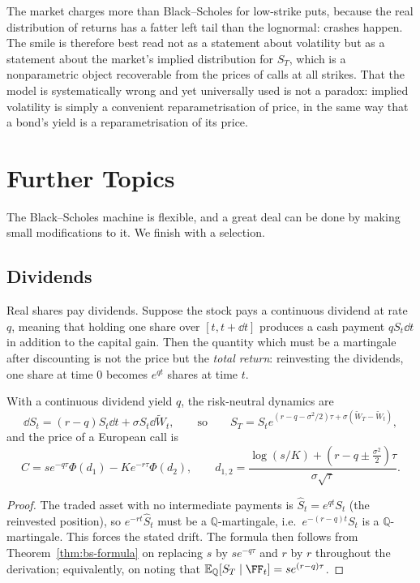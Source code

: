 \documentclass[a4paper]{scrartcl}
\newcommand{\QQ}{\mathbb{Q}}
\begin{document}
The market charges more than Black--Scholes for low-strike puts, because the real distribution of returns has a fatter left tail than the lognormal: crashes happen. The smile is therefore best read not as a statement about volatility but as a statement about the market's implied distribution for $S_T$, which is a nonparametric object recoverable from the prices of calls at all strikes. That the model is systematically wrong and yet universally used is not a paradox: implied volatility is simply a convenient reparametrisation of price, in the same way that a bond's yield is a reparametrisation of its price.

\section{Further Topics}

The Black--Scholes machine is flexible, and a great deal can be done by making small modifications to it. We finish with a selection.

\subsection{Dividends}

Real shares pay dividends. Suppose the stock pays a continuous dividend at rate $q$, meaning that holding one share over $[t,t+\dd t]$ produces a cash payment $qS_t\dd t$ in addition to the capital gain. Then the quantity which must be a martingale after discounting is not the price but the \emph{total return}: reinvesting the dividends, one share at time $0$ becomes $e^{qt}$ shares at time $t$.

\begin{proposition}
	With a continuous dividend yield $q$, the risk-neutral dynamics are
	$$
	\dd S_t = (r-q)S_t\dd t + \sigma S_t\dd\tilde W_t,\qquad\text{so}\qquad S_T = S_te^{(r-q-\sigma^2/2)\tau + \sigma(\tilde W_T-\tilde W_t)},
	$$
	and the price of a European call is
	$$
	C = se^{-q\tau}\Phi(d_1) - Ke^{-r\tau}\Phi(d_2), \qquad d_{1,2} = \frac{\log(s/K) + (r - q\pm\tfrac{\sigma^2}{2})\tau}{\sigma\sqrt\tau}.
	$$
\end{proposition}

\begin{proof}
	The traded asset with no intermediate payments is $\hat S_t = e^{qt}S_t$ (the reinvested position), so $e^{-rt}\hat S_t$ must be a $\QQ$-martingale, i.e.\ $e^{-(r-q)t}S_t$ is a $\QQ$-martingale. This forces the stated drift. The formula then follows from Theorem~\ref{thm:bs-formula} on replacing $s$ by $se^{-q\tau}$ and $r$ by $r$ throughout the derivation; equivalently, on noting that $\EE_\QQ[S_T\mid\FF_t] = se^{(r-q)\tau}$.
\end{proof}
\end{document}
